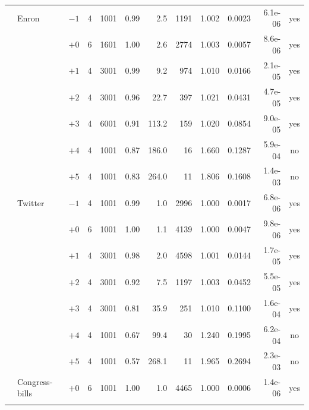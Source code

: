 \begin{table}[t]
\begin{tabular}{llrrrrrrrrrc}
\addlinespace[2pt]
 & Enron & $-1$ & 4 & 1001 & 0.99 & 2.5 & 1191 & 1.002 & 0.0023 & 6.1e-06 & yes \\
 &  & $+0$ & 6 & 1601 & 1.00 & 2.6 & 2774 & 1.003 & 0.0057 & 8.6e-06 & yes \\
 &  & $+1$ & 4 & 3001 & 0.99 & 9.2 & 974 & 1.010 & 0.0166 & 2.1e-05 & yes \\
 &  & $+2$ & 4 & 3001 & 0.96 & 22.7 & 397 & 1.021 & 0.0431 & 4.7e-05 & yes \\
 &  & $+3$ & 4 & 6001 & 0.91 & 113.2 & 159 & 1.020 & 0.0854 & 9.0e-05 & yes \\
 &  & $+4$ & 4 & 1001 & 0.87 & 186.0 & 16 & 1.660 & 0.1287 & 5.9e-04 & no \\
 &  & $+5$ & 4 & 1001 & 0.83 & 264.0 & 11 & 1.806 & 0.1608 & 1.4e-03 & no \\
\addlinespace[2pt]
 & Twitter & $-1$ & 4 & 1001 & 0.99 & 1.0 & 2996 & 1.000 & 0.0017 & 6.8e-06 & yes \\
 &  & $+0$ & 6 & 1001 & 1.00 & 1.1 & 4139 & 1.000 & 0.0047 & 9.8e-06 & yes \\
 &  & $+1$ & 4 & 3001 & 0.98 & 2.0 & 4598 & 1.001 & 0.0144 & 1.7e-05 & yes \\
 &  & $+2$ & 4 & 3001 & 0.92 & 7.5 & 1197 & 1.003 & 0.0452 & 5.5e-05 & yes \\
 &  & $+3$ & 4 & 3001 & 0.81 & 35.9 & 251 & 1.010 & 0.1100 & 1.6e-04 & yes \\
 &  & $+4$ & 4 & 1001 & 0.67 & 99.4 & 30 & 1.240 & 0.1995 & 6.2e-04 & no \\
 &  & $+5$ & 4 & 1001 & 0.57 & 268.1 & 11 & 1.965 & 0.2694 & 2.3e-03 & no \\
\addlinespace[2pt]
 & Congress-bills & $+0$ & 6 & 1001 & 1.00 & 1.0 & 4465 & 1.000 & 0.0006 & 1.4e-06 & yes \\
\addlinespace[2pt]
\bottomrule
\end{tabular}
\end{table}
